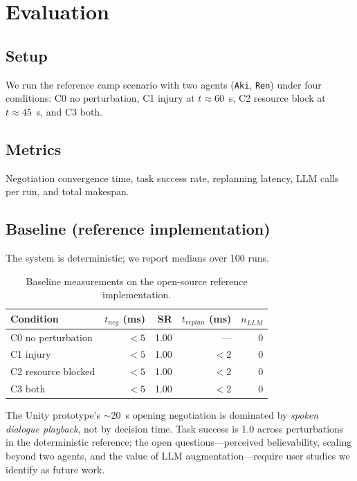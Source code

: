 \documentclass[sigconf, authorversion]{acmart}
\begin{document}
\section{Evaluation}
\label{sec:eval}
\subsection{Setup}
We run the reference camp scenario with two agents (\texttt{Aki},
\texttt{Ren}) under four conditions: C0 no perturbation, C1 injury at
$t\approx60$~s, C2 resource block at $t\approx45$~s, and C3 both.

\subsection{Metrics}
Negotiation convergence time, task success rate, replanning latency,
LLM calls per run, and total makespan.

\subsection{Baseline (reference implementation)}
The system is deterministic; we report medians over 100 runs.

\begin{table}[h]
\centering
\caption{Baseline measurements on the open-source reference implementation.}
\begin{tabular}{lrrrr}
\hline
Condition & $t_{neg}$ (ms) & SR & $t_{replan}$ (ms) & $n_{LLM}$ \\
\hline
C0 no perturbation   & $<5$ & 1.00 & ---   & 0 \\
C1 injury            & $<5$ & 1.00 & $<2$  & 0 \\
C2 resource blocked  & $<5$ & 1.00 & $<2$  & 0 \\
C3 both              & $<5$ & 1.00 & $<2$  & 0 \\
\hline
\end{tabular}
\end{table}

The Unity prototype's $\sim$20~s opening negotiation is dominated by
\emph{spoken dialogue playback}, not by decision time. Task success is
1.0 across perturbations in the deterministic reference; the open
questions---perceived believability, scaling beyond two agents, and the
value of LLM augmentation---require user studies we identify as future
work.
\end{document}
